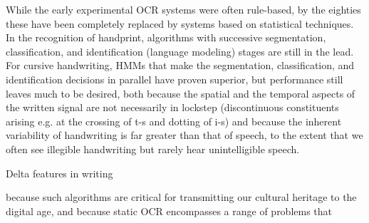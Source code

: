 While the early experimental OCR systems were often rule-based, by the
eighties these have been completely replaced by systems based on statistical
techniques.  In the recognition of handprint, algorithms with successive
segmentation, classification, and identification (language modeling) stages
are still in the lead. For cursive handwriting, HMMs that make the
segmentation, classification, and identification decisions in parallel have
proven superior, but performance still leaves much to be desired, both because
the spatial and the temporal aspects of the written signal are not necessarily
in lockstep (discontinuous constituents arising e.g. at the crossing of t-s
and dotting of i-s) and because the inherent variability of handwriting is far
greater than that of speech, to the extent that we often see illegible
handwriting but rarely hear unintelligible speech.

Delta features in writing

because such algorithms are critical for transmitting our cultural heritage to
the digital age, and because static OCR encompasses a range of problems that
